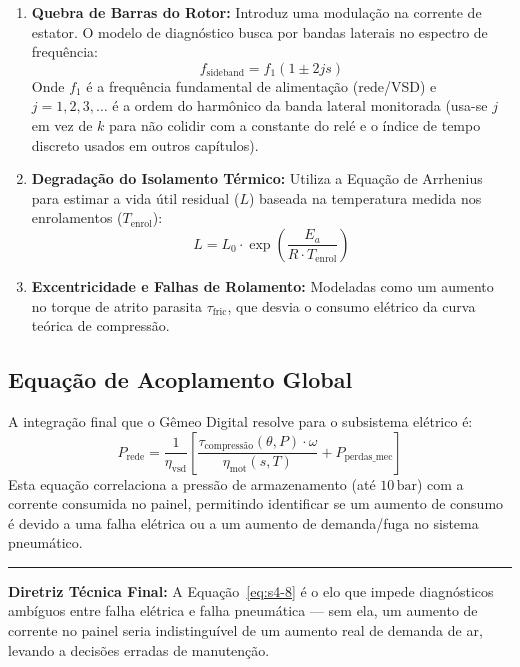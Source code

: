 \documentclass[12pt,a4paper]{article}
\numberwithin{equation}{section}
\numberwithin{table}{section}
\numberwithin{figure}{section}
\begin{document}
	\begin{enumerate}
		\item \textbf{Quebra de Barras do Rotor:} Introduz uma modulação na corrente de estator. O modelo de diagnóstico busca por bandas laterais no espectro de frequência:
		\begin{equation}\label{eq:s4-6}
 f_{\text{sideband}} = f_1 (1 \pm 2js) 
\end{equation}
		Onde $f_1$ é a frequência fundamental de alimentação (rede/VSD) e $j = 1, 2, 3, \dots$ é a ordem do harmônico da banda lateral monitorada (usa-se $j$ em vez de $k$ para não colidir com a constante do relé e o índice de tempo discreto usados em outros capítulos).
		\item \textbf{Degradação do Isolamento Térmico:} Utiliza a Equação de Arrhenius para estimar a vida útil residual ($L$) baseada na temperatura medida nos enrolamentos ($T_{\text{enrol}}$):
		\begin{equation}\label{eq:s4-7}
 L = L_0 \cdot \exp \left( \frac{E_a}{R \cdot T_{\text{enrol}}} \right) 
\end{equation}
		\item \textbf{Excentricidade e Falhas de Rolamento:} Modeladas como um aumento no torque de atrito parasita $\tau_{\text{fric}}$, que desvia o consumo elétrico da curva teórica de compressão.
	\end{enumerate}
	
	\subsection{\textbf{Equação de Acoplamento Global}}
	A integração final que o Gêmeo Digital resolve para o subsistema elétrico é:
	\begin{equation}\label{eq:s4-8}
 P_{\text{rede}} = \frac{1}{\eta_{\text{vsd}}} \left[ \frac{\tau_{\text{compressão}}(\theta, P) \cdot \omega}{\eta_{\text{mot}}(s, T)} + P_{\text{perdas\_mec}} \right] 
\end{equation}
	Esta equação correlaciona a pressão de armazenamento (até $10\,\text{bar}$) com a corrente consumida no painel, permitindo identificar se um aumento de consumo é devido a uma falha elétrica ou a um aumento de demanda/fuga no sistema pneumático.

	\vspace{1em}
	\hrule
	\vspace{1em}

	\textbf{Diretriz Técnica Final:} A Equação~\eqref{eq:s4-8} é o elo que impede diagnósticos ambíguos entre falha elétrica e falha pneumática — sem ela, um aumento de corrente no painel seria indistinguível de um aumento real de demanda de ar, levando a decisões erradas de manutenção.
\end{document}
